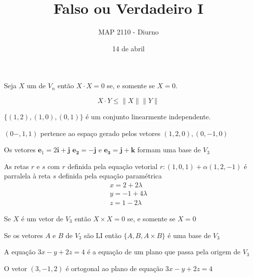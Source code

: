 \documentclass{beamer}
\title[]{Falso ou Verdadeiro I}
\author{MAP 2110 - Diurno}
\institute{IME USP}
\date{14 de abril}
\begin{document}
\begin{frame}
  \titlepage
\end{frame}


\begin{frame}{}
 Seja $X$ um  de $V_n$ então $X\cdot X =0$ se, e somente se $X=0$.
\end{frame}

\begin{frame}{}
$$X\cdot Y \leq \|X\|\|Y\|$$
\end{frame}

\begin{frame}
  $\{ (1,2), (1,0), (0,1)\}$ é um conjunto linearmente independente.
\end{frame}

\begin{frame}{}

  $(0-,1, 1)$ pertence ao espaço gerado pelos vetores ${(1,2,0), (0,-1, 0)}$

\end{frame}

\begin{frame}
  Os vetores $\mathbf{e}_1 = 2\mathbf{i}+\mathbf{j}$ $\mathbf{e_2}= -\mathbf{j}$ e
  $\mathbf{e_3}=\mathbf{j}+\mathbf{k}$ formam uma base de $V_3$
\end{frame}

\begin{frame}
  As retas $r$ e $s$
  com $r$ definida pela equação vetorial  $r: (1,0,1) + \alpha (1,2,-1)$ é parralela 
  à reta $s$ definida pela equação paramétrica
  \begin{gather*}
    x= 2 + 2\lambda \\
    y= -1 + 4\lambda \\
    z= 1  - 2\lambda
  \end{gather*}
\end{frame}


\begin{frame}{}
  Se $X$ é um vetor de $V_3$ então $X\times X = 0$ se, e somente se $X=0$
\end{frame}

\begin{frame}{}
 Se os vetores $A$ e $B$ de $V_3$ são LI então $\{A,B,A\times B\}$ é uma 
 base de $V_3$
\end{frame}

\begin{frame}
 A equação $3x-y+ 2z =4$ é a equação de um plano que passa pela origem de $V_3$
\end{frame}

\begin{frame}
  O vetor $(3,-1,2)$ é ortogonal ao plano de equação $3x-y+ 2z =4$
\end{frame}
\end{document}
